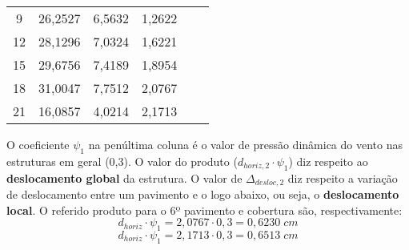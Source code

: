 \begin{table}[H]
\begin{tabular}{c|c|c|c|c|c}
9                                                 & 26,2527                                                                      & 6,5632                                                              & 1,2622                                                                &                                                                            &                                                                    \\
12                                                & 28,1296                                                                      & 7,0324                                                              & 1,6221                                                                &                                                                            &                                                                    \\
15                                                & 29,6756                                                                      & 7,4189                                                              & 1,8954                                                                &                                                                            &                                                                    \\
18                                                & 31,0047                                                                      & 7,7512                                                              & 2,0767                                                                &                                                                            &                                                                    \\
21                                                & 16,0857                                                                      & 4,0214                                                              & 2,1713                                                                &                                                                            &                                                                    \\ \hline
\end{tabular}
\end{table}

O coeficiente $\psi_1$ na penúltima coluna é o valor de pressão dinâmica do vento nas estruturas em geral (0,3). O valor do produto ($d_{horiz, 2}\cdot\psi_1$) diz respeito ao \textbf{deslocamento global} da estrutura. O valor de $\Delta_{desloc, 2}$ diz respeito a variação de deslocamento entre um pavimento e o logo abaixo, ou seja, o \textbf{deslocamento local}. O referido produto para o 6º pavimento e cobertura são, respectivamente:
$$d_{horiz}\cdot\psi_1=2,0767\cdot0,3=0,6230\;cm$$
$$d_{horiz}\cdot\psi_1=2,1713\cdot0,3=0,6513\;cm$$

